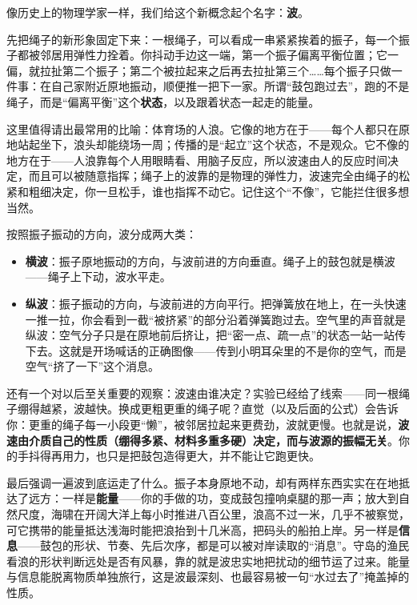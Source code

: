 
\begin{mainline}
像历史上的物理学家一样，我们给这个新概念起个名字：\textbf{波}。

先把绳子的新形象固定下来：一根绳子，可以看成一串紧紧挨着的振子，每一个振子都被邻居用弹性力拴着。你抖动手边这一端，第一个振子偏离平衡位置；它一偏，就拉扯第二个振子；第二个被拉起来之后再去拉扯第三个……每个振子只做一件事：在自己家附近原地振动，顺便推一把下一家。所谓“鼓包跑过去”，跑的不是绳子，而是“偏离平衡”这个\textbf{状态}，以及跟着状态一起走的能量。

这里值得请出最常用的比喻：体育场的人浪。它像的地方在于——每个人都只在原地站起坐下，浪头却能绕场一周；传播的是“起立”这个状态，不是观众。它不像的地方在于——人浪靠每个人用眼睛看、用脑子反应，所以波速由人的反应时间决定，而且可以被随意指挥；绳子上的波靠的是物理的弹性力，波速完全由绳子的松紧和粗细决定，你一旦松手，谁也指挥不动它。记住这个“不像”，它能拦住很多想当然。

按照振子振动的方向，波分成两大类：

\begin{itemize}
  \item \textbf{横波}：振子原地振动的方向，与波前进的方向垂直。绳子上的鼓包就是横波——绳子上下动，波水平走。
  \item \textbf{纵波}：振子振动的方向，与波前进的方向平行。把弹簧放在地上，在一头快速一推一拉，你会看到一截“被挤紧”的部分沿着弹簧跑过去。空气里的声音就是纵波：空气分子只是在原地前后挤让，把“密一点、疏一点”的状态一站一站传下去。这就是开场喊话的正确图像——传到小明耳朵里的不是你的空气，而是空气“挤了一下”这个消息。
\end{itemize}

还有一个对以后至关重要的观察：波速由谁决定？实验已经给了线索——同一根绳子绷得越紧，波越快。换成更粗更重的绳子呢？直觉（以及后面的公式）会告诉你：更重的绳子每一小段更“懒”，被邻居拉起来更费劲，波就更慢。也就是说，\textbf{波速由介质自己的性质（绷得多紧、材料多重多硬）决定，而与波源的振幅无关}。你的手抖得再用力，也只是把鼓包造得更大，并不能让它跑更快。

最后强调一遍波到底运走了什么。振子本身原地不动，却有两样东西实实在在地抵达了远方：一样是\textbf{能量}——你的手做的功，变成鼓包撞响桌腿的那一声；放大到自然尺度，海啸在开阔大洋上每小时推进八百公里，浪高不过一米，几乎不被察觉，可它携带的能量抵达浅海时能把浪抬到十几米高，把码头的船拍上岸。另一样是\textbf{信息}——鼓包的形状、节奏、先后次序，都是可以被对岸读取的“消息”。守岛的渔民看浪的形状判断远处是否有风暴，靠的就是波忠实地把扰动的细节运了过来。能量与信息能脱离物质单独旅行，这是波最深刻、也最容易被一句“水过去了”掩盖掉的性质。
\end{mainline}

